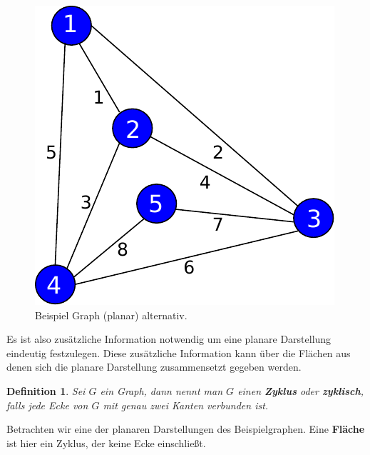 \documentclass[11pt,a4paper,leqno]{report}
\newtheorem{definition}[theorem]{Definition}
\numberwithin{equation}{chapter}
\begin{document}
\begin{figure}[H]
	\begin{center}
		\includegraphics[scale=0.4]{Abbildungen/graph_1_planar2.pdf}
		\caption{Beispiel Graph (planar) alternativ.}
	\end{center}
\end{figure}
\noindent
Es ist also zus\"atzliche Information notwendig um eine planare Darstellung eindeutig festzulegen. Diese zus\"atzliche Information kann \"uber die Fl\"achen aus denen sich die planare Darstellung zusammensetzt gegeben werden.\\
\begin{definition}
	Sei $G$ ein Graph, dann nennt man $G$ einen \textbf{Zyklus} oder \textbf{zyklisch}, falls jede Ecke von $G$ mit genau zwei Kanten verbunden ist.
\end{definition}
\noindent
Betrachten wir eine der planaren Darstellungen des Beispielgraphen. Eine \textbf{Fl\"ache} ist hier ein Zyklus, der keine Ecke einschlie\ss{}t.
\end{document}
